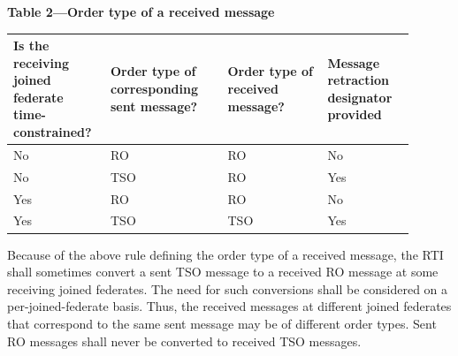 \begin{compactstdpage}
    \begin{center}
        {\sffamily\bfseries\fontsize{8.5}{10}\selectfont Table 2---Order type of a received message}\par\vspace{5pt}
    {\fontsize{6.3}{7.3}\selectfont\setlength{\tabcolsep}{3pt}\renewcommand{\arraystretch}{1.15}%
        \begin{tabular}{|>{\centering\arraybackslash}p{0.20\linewidth}|>{\centering\arraybackslash}p{0.27\linewidth}|>{\centering\arraybackslash}p{0.23\linewidth}|>{\centering\arraybackslash}p{0.20\linewidth}|}
            \hline
            \textbf{Is the receiving joined federate time-constrained?} & \textbf{Order type of corresponding sent message?} & \textbf{Order type of received message?} & \textbf{Message retraction designator provided} \\ \hline
            No                                                          & RO                                                 & RO                                       & No                                              \\ \hline
            No                                                          & TSO                                                & RO                                       & Yes                                             \\ \hline
            Yes                                                         & RO                                                 & RO                                       & No                                              \\ \hline
            Yes                                                         & TSO                                                & TSO                                      & Yes                                             \\ \hline
        \end{tabular}}
    \end{center}

    Because of the above rule defining the order type of a received message, the RTI shall sometimes convert a sent TSO message to a received RO message at some receiving joined federates. The need for such conversions shall be considered on a per-joined-federate basis. Thus, the received messages at different joined federates that correspond to the same sent message may be of different order types. Sent RO messages shall never be converted to received TSO messages.


\end{compactstdpage}
